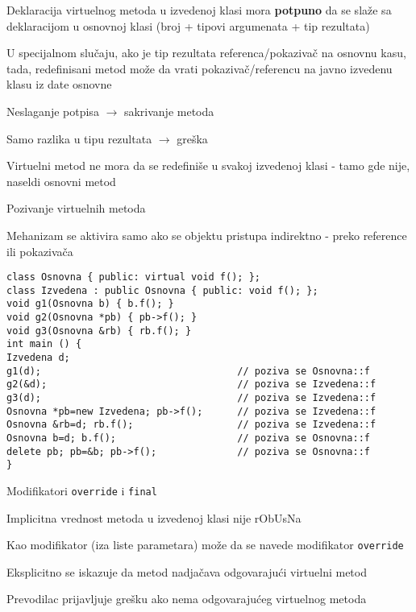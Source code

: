 \documentclass{article}
\newenvironment{xitemize}{%
    
    \itemize
    \larger
}{%
    \enditemize
}
\let\olditemize\itemize
\let\endolditemize\enditemize
\renewenvironment{itemize}{%
    \smaller
    \olditemize
}{%
    \endolditemize
}
\providecommand{\inlinecode}[1]{\texttt{#1}}
\begin{document}
\begin{xitemize}
\begin{itemize}
    \item Deklaracija virtuelnog metoda u izvedenoj klasi mora \textbf{potpuno} da se slaže sa deklaracijom u osnovnoj klasi (broj + tipovi argumenata + tip rezultata)
    \item U specijalnom slučaju, ako je tip rezultata referenca/pokazivač na osnovnu kasu, tada, redefinisani metod može da vrati pokazivač/referencu na javno izvedenu klasu iz date osnovne
    \item Neslaganje potpisa $\rightarrow$ sakrivanje metoda
    \item Samo razlika u tipu rezultata $\rightarrow$ greška
    \item Virtuelni metod ne mora da se redefiniše u svakoj izvedenoj klasi - tamo gde nije, naseldi osnovni metod
\end{itemize}
\item Pozivanje virtuelnih metoda
\begin{itemize}
    \item Mehanizam se aktivira samo ako se objektu pristupa indirektno - preko reference ili pokazivača
    \begin{lstlisting}
class Osnovna { public: virtual void f(); };
class Izvedena : public Osnovna { public: void f(); };
void g1(Osnovna b) { b.f(); }
void g2(Osnovna *pb) { pb->f(); }
void g3(Osnovna &rb) { rb.f(); }
int main () {
Izvedena d;
g1(d);                                  // poziva se Osnovna::f
g2(&d);                                 // poziva se Izvedena::f
g3(d);                                  // poziva se Izvedena::f
Osnovna *pb=new Izvedena; pb->f();      // poziva se Izvedena::f
Osnovna &rb=d; rb.f();                  // poziva se Izvedena::f
Osnovna b=d; b.f();                     // poziva se Osnovna::f
delete pb; pb=&b; pb->f();              // poziva se Osnovna::f
}
    \end{lstlisting}
\end{itemize}
\item Modifikatori \inlinecode{override} i \inlinecode{final}
\begin{itemize}
    \item Implicitna vrednost metoda u izvedenoj klasi nije rObUsNa
    \item Kao modifikator (iza liste parametara) može da se navede modifikator \inlinecode{override}
    \item Eksplicitno se iskazuje da metod nadjačava odgovarajući virtuelni metod
    \item Prevodilac prijavljuje grešku ako nema odgovarajućeg virtuelnog metoda

\end{itemize}
\end{xitemize}
\end{document}
